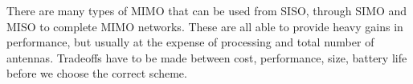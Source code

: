 There are many types of MIMO that can be used from SISO, through SIMO and MISO to complete MIMO networks. These are all able to provide heavy gains in performance, but usually at the expense of processing and total number of antennas. Tradeoffs have to be made between cost, performance, size, battery life before we choose the correct scheme.



